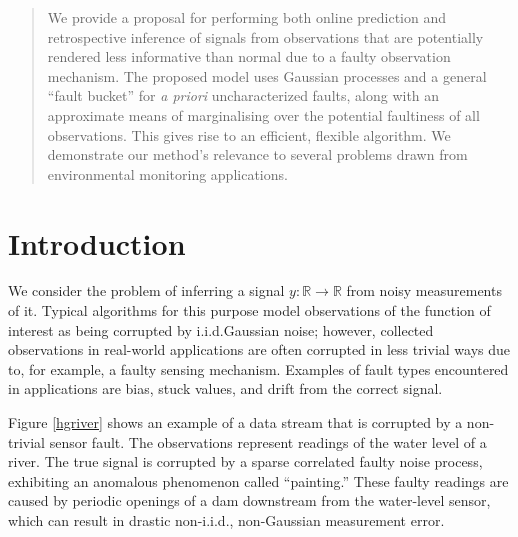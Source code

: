\documentclass{article}
\newcommand{\psff}[1]{\texttt{[image: \#1.eps]}}
\newcommand{\R}{\ensuremath{\mathbb{R}}}
\begin{document}

\begin{abstract}
We provide a proposal for performing both online prediction and
retrospective inference of signals from observations that are
potentially rendered less informative than normal due to a faulty
observation mechanism.  The proposed model uses Gaussian processes
and a general ``fault bucket'' for \textit{a priori} uncharacterized
faults, along with an approximate means of marginalising over the potential 
faultiness of all observations. This gives rise to an efficient, flexible algorithm. We demonstrate our method's relevance to several problems drawn from environmental monitoring applications.
\end{abstract}

\section{Introduction}
We consider the problem of inferring a signal $y\colon \R \to \R$ from
noisy measurements of it.  Typical algorithms for this purpose model
observations of the function of interest as being corrupted by
i.i.d.\space Gaussian noise; however, collected observations in
real-world applications are often corrupted in less trivial ways due
to, for example, a faulty sensing mechanism.  Examples of fault types
encountered in applications are bias, stuck values, and drift from the
correct signal.

Figure \ref{hgriver} shows an example of a data stream that is
corrupted by a non-trivial sensor fault.  The observations represent
readings of the water level of a river.  The true signal is corrupted
by a sparse correlated faulty noise process, exhibiting an anomalous
phenomenon called ``painting.''  These faulty readings are caused by
periodic openings of a dam downstream from the water-level sensor,
which can result in drastic non-i.i.d., non-Gaussian measurement
error.

\end{document}
